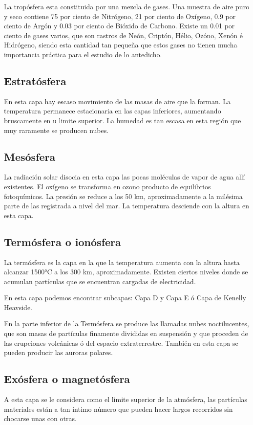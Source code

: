 \documentclass[12pt,letterpaper]{article}
\begin{document}
\begin{portada}
La tropósfera esta constituida por una mezcla de gases. Una muestra de aire puro y seco contiene 75 por ciento de Nitrógeno, 21 por ciento de Oxígeno, 0.9 por ciento de Argón y 0.03 por ciento de Bióxido de Carbono. Existe un 0.01 por ciento de gases varios, que son rastros de Neón, Criptón, Hélio, Ozóno, Xenón é Hidrógeno, siendo esta cantidad tan pequeña que estos gases no tienen mucha importancia práctica para el estudio de lo antedicho. 


\subsection {Estratósfera}
En esta capa hay escaso movimiento de las masas de aire que la forman. La temperatura permanece estacionaria en las capas inferiores, aumentando bruscamente en u limite superior. La humedad es tan escasa en esta región que muy raramente se producen nubes.


\subsection{Mesósfera}
La radiación solar disocia en esta capa las pocas moléculas de vapor de agua allí existentes. El oxígeno se transforma en ozono producto de equilibrios fotoquímicos. La presión se reduce a los 50 km, aproximadamente a la milésima parte de las registrada a nivel del mar. La temperatura desciende con la altura en esta capa. 


\subsection{Termósfera o ionósfera}
La termósfera es la capa en la que la temperatura aumenta con la altura hasta alcanzar 1500°C a los 300 km, aproximadamente. Existen ciertos niveles donde se acumulan partículas que se encuentran cargadas de electricidad. 

En esta capa podemos encontrar subcapas: Capa D y Capa E ó Capa de Kenelly Heavside.

En la parte inferior de la Termósfera se produce las llamadas nubes noctilucentes, que son masas de partículas finamente divididas en suspensión y que proceden de las erupciones volcánicas ó del espacio extraterrestre. También en esta capa se pueden producir las auroras polares. 

\subsection {Exósfera o magnetósfera}
A esta capa se le considera como el limite superior de la atmósfera, las partículas materiales están a tan íntimo número que pueden hacer largos recorridos sin chocarse unas con otras.


\end{portada}
\end{document}
